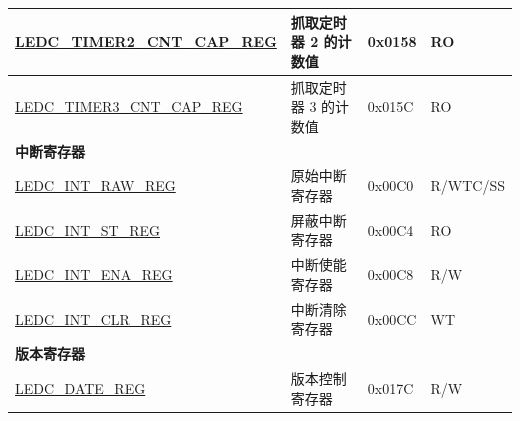 \begin{longtable}{ | p{6cm} | p{4.5cm} | p{1.3cm} | p{1.7cm} | }
\hyperref[regdesc:LEDCTIMERXCNTCAPREG]{LEDC\_TIMER2\_CNT\_CAP\_REG} & 抓取定时器 2 的计数值 & 0x0158 & RO \\ \hline
\hyperref[regdesc:LEDCTIMERXCNTCAPREG]{LEDC\_TIMER3\_CNT\_CAP\_REG} & 抓取定时器 3 的计数值 & 0x015C & RO \\ \hline
\multicolumn{4}{|l|}{\textbf{中断寄存器}} \\ \hline
\hyperref[regdesc:LEDCINTRAWREG]{LEDC\_INT\_RAW\_REG} & 原始中断寄存器 & 0x00C0 & R/WTC/SS \\ \hline
\hyperref[regdesc:LEDCINTSTREG]{LEDC\_INT\_ST\_REG} & 屏蔽中断寄存器 & 0x00C4 & RO \\ \hline
\hyperref[regdesc:LEDCINTENAREG]{LEDC\_INT\_ENA\_REG} & 中断使能寄存器 & 0x00C8 & R/W \\ \hline
\hyperref[regdesc:LEDCINTCLRREG]{LEDC\_INT\_CLR\_REG} & 中断清除寄存器 & 0x00CC & WT \\ \hline
\multicolumn{4}{|l|}{\textbf{版本寄存器}} \\ \hline
\hyperref[regdesc:LEDCDATEREG]{LEDC\_DATE\_REG} & 版本控制寄存器 & 0x017C & R/W \\ \hline
\end{longtable}
